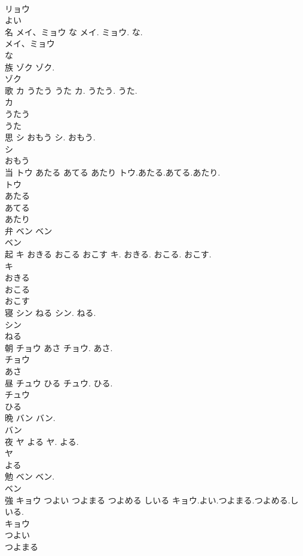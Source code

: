 \documentclass[8pt]{extreport}
\begin{document}
\begin{CJK}{UTF8}{min}
\\	リョウ
\\	よい
\\	名	メイ、ミョウ な	メイ. ミョウ. な.	
\\	メイ、ミョウ
\\	な
\\	族	ゾク	ゾク.	
\\	ゾク
\\	歌	カ うたう うた	カ. うたう. うた.	
\\	カ
\\	うたう
\\	うた
\\	思	シ おもう	シ. おもう.	
\\	シ
\\	おもう
\\	当	トウ あたる あてる あたり	トウ.あたる.あてる.あたり.	
\\	トウ
\\	あたる
\\	あてる
\\	あたり
\\	弁	ベン	ベン	
\\	ベン
\\	起	キ おきる おこる おこす	キ. おきる. おこる. おこす.	
\\	キ
\\	おきる
\\	おこる
\\	おこす
\\	寝	シン ねる	シン. ねる.	
\\	シン
\\	ねる
\\	朝	チョウ あさ	チョウ. あさ.	
\\	チョウ
\\	あさ
\\	昼	チュウ ひる	チュウ. ひる.	
\\	チュウ
\\	ひる
\\	晩	バン	バン.	
\\	バン
\\	夜	ヤ よる	ヤ. よる.	
\\	ヤ
\\	よる
\\	勉	ベン	ベン.	
\\	ベン
\\	強	キョウ つよい つよまる つよめる しいる	キョウ.よい.つよまる.つよめる.しいる.	
\\	キョウ
\\	つよい
\\	つよまる

\end{CJK}
\end{document}
